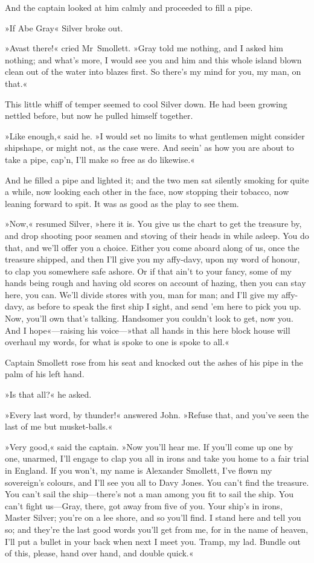And the captain looked at him calmly and proceeded to fill a pipe.

»If Abe Gray\longdash« Silver broke out.

»Avast there!« cried Mr~Smollett. »Gray told me nothing, and I asked him nothing; and what's more, I would see you and him and this whole island blown clean out of the water into blazes first. So there's my mind for you, my man, on that.«

This little whiff of temper seemed to cool Silver down. He had been growing nettled before, but now he pulled himself together.

»Like enough,« said he. »I would set no limits to what gentlemen might consider shipshape, or might not, as the case were. And seein' as how you are about to take a pipe, cap'n, I'll make so free as do likewise.«

And he filled a pipe and lighted it; and the two men sat silently smoking for quite a while, now looking each other in the face, now stopping their tobacco, now leaning forward to spit. It was as good as the play to see them.

»Now,« resumed Silver, »here it is. You give us the chart to get the treasure by, and drop shooting poor seamen and stoving of their heads in while asleep. You do that, and we'll offer you a choice. Either you come aboard along of us, once the treasure shipped, and then I'll give you my affy-davy, upon my word of honour, to clap you somewhere safe ashore. Or if that ain't to your fancy, some of my hands being rough and having old scores on account of hazing, then you can stay here, you can. We'll divide stores with you, man for man; and I'll give my affy-davy, as before to speak the first ship I sight, and send 'em here to pick you up. Now, you'll own that's talking. Handsomer you couldn't look to get, now you. And I hope«—raising his voice—»that all hands in this here block house will overhaul my words, for what is spoke to one is spoke to all.«

Captain Smollett rose from his seat and knocked out the ashes of his pipe in the palm of his left hand.

»Is that all?« he asked.

»Every last word, by thunder!« answered John. »Refuse that, and you've seen the last of me but musket-balls.«

»Very good,« said the captain. »Now you'll hear me. If you'll come up one by one, unarmed, I'll engage to clap you all in irons and take you home to a fair trial in England. If you won't, my name is Alexander Smollett, I've flown my sovereign's colours, and I'll see you all to Davy Jones. You can't find the treasure. You can't sail the ship—there's not a man among you fit to sail the ship. You can't fight us—Gray, there, got away from five of you. Your ship's in irons, Master Silver; you're on a lee shore, and so you'll find. I stand here and tell you so; and they're the last good words you'll get from me, for in the name of heaven, I'll put a bullet in your back when next I meet you. Tramp, my lad. Bundle out of this, please, hand over hand, and double quick.«

